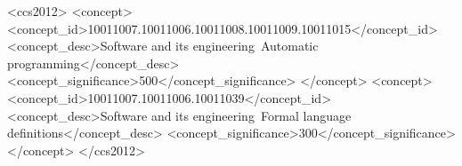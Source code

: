 \documentclass[manuscript,screen]{acmart}
\begin{document}

\begin{CCSXML}
<ccs2012>
<concept>
<concept_id>10011007.10011006.10011008.10011009.10011015</concept_id>
<concept_desc>Software and its engineering~Automatic programming</concept_desc>
<concept_significance>500</concept_significance>
</concept>
<concept>
<concept_id>10011007.10011006.10011039</concept_id>
<concept_desc>Software and its engineering~Formal language definitions</concept_desc>
<concept_significance>300</concept_significance>
</concept>
</ccs2012>
\end{CCSXML}



\maketitle















\newpage
\appendix

\end{document}
